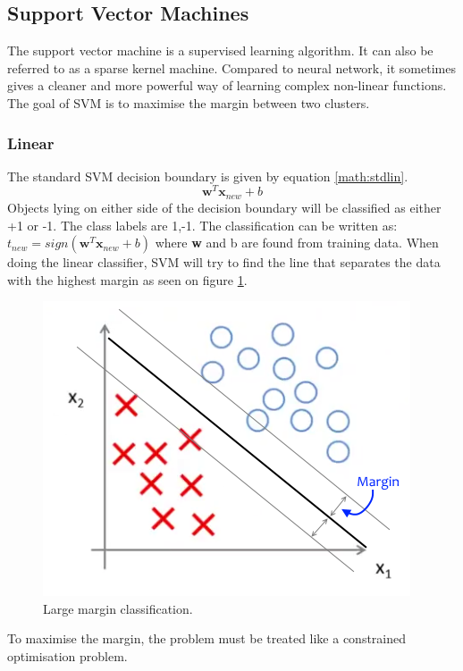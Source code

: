 
\subsection{Support Vector Machines}
The support vector machine is a supervised learning algorithm. It can also be referred to as a sparse kernel machine. 
Compared to neural network, it sometimes gives a cleaner and more powerful way of learning complex non-linear functions. 
The goal of SVM is to maximise the margin between two clusters.

\subsubsection{Linear}
The standard SVM decision boundary is given by equation \ref{math:stdlin}.
\begin{equation}
\label{math:stdlin}
\textbf{w}^T\textbf{x}_{new} + b
\end{equation}
Objects lying on either side of the decision boundary will be classified as either +1 or -1. The class labels are {1,-1}. The classification can be written as: $t_{new} = sign(\textbf{w}^T\textbf{x}_{new} + b)$ where \textbf{w} and b are found from training data.
When doing the linear classifier, SVM will try to find the line that separates the data with the highest margin as seen on figure \ref{fig:svm-margin}.
\begin{figure}[H]
\centering
\includegraphics[scale=.75]{billeder/svm-margin}
\caption{Large margin classification.}
\label{fig:svm-margin}
\end{figure}
To maximise the margin, the problem must be treated like a constrained optimisation problem.

